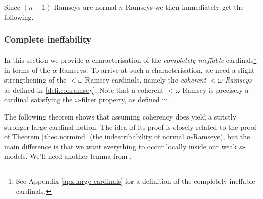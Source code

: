 \documentclass[../../main]{subfiles}
\begin{document}
Since $(n{+}1)$-Ramseys are normal $n$-Ramseys we then immediately get the following.



\subsubsection{Complete ineffability}

In this section we provide a characterisation of the \textit{completely ineffable} cardinals\footnote{See Appendix \ref{apx.large-cardinals} for a definition of the completely ineffable cardinals.} in terms of the $\alpha$-Ramseys. To arrive at such a characterisation, we need a slight strengthening of the ${<}\omega$-Ramsey cardinals, namely the \textit{coherent ${<}\omega$-Ramseys} as defined in \ref{defi.cohramsey}. Note that a coherent ${<}\omega$-Ramsey is precisely a cardinal satisfying the $\omega$-filter property, as defined in \cite{HolySchlicht}.

\qquad The following theorem shows that assuming coherency does yield a strictly stronger large cardinal notion. The idea of its proof is closely related to the proof of Theorem \ref{theo.normind} (the indescribability of normal $n$-Ramseys), but the main difference is that we want everything to occur locally inside our weak $\kappa$-models. We'll need another lemma from \cite{Abramson}.

\end{document}
